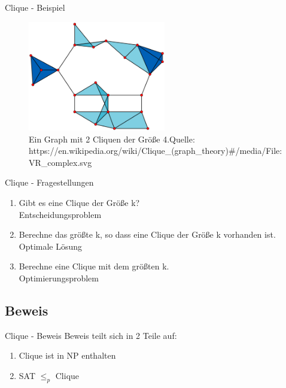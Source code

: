 \documentclass[12pt,donthandout,notes=dontshow,xcolor=table]{beamer}
\begin{document}
\begin{frame}{Clique - Beispiel}
\begin{figure}
\includegraphics[width=6cm]{figures/clique2.png}
\caption{Ein Graph mit 2 Cliquen der Größe 4.\newline \newline \tiny Quelle: https://en.wikipedia.org/wiki/Clique\_(graph\_theory)\#/media/File:VR\_complex.svg}
\end{figure}
\end{frame}

\begin{frame}{Clique - Fragestellungen}
\begin{enumerate}
\item Gibt es eine Clique der Größe k?\\
\textrightarrow Entscheidungsproblem
\newline \pause
\item Berechne das größte k, so dass eine Clique der Größe k vorhanden ist.\\
\textrightarrow Optimale Lösung
\newline \pause
\item Berechne eine Clique mit dem größten k.\\
\textrightarrow Optimierungsproblem
\end{enumerate}
\end{frame}

\subsection{Beweis}
\begin{frame}{Clique - Beweis}
Beweis teilt sich in 2 Teile auf:
\begin{enumerate}
\item Clique ist in NP enthalten
\item SAT $\le_p$ Clique
\end{enumerate}
\end{frame}
\end{document}
